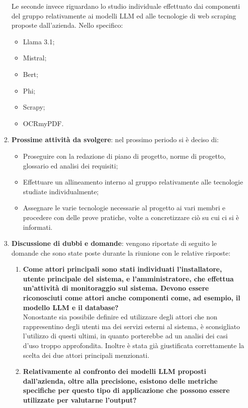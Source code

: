 \begin{enumerate}
    Le seconde invece riguardano lo studio individuale effettuato dai componenti del gruppo relativamente ai modelli LLM ed alle tecnologie di web scraping proposte dall'azienda. Nello specifico:
    \begin{itemize}
        \item Llama 3.1;
        \item Mistral;
        \item Bert;
        \item Phi;
        \item Scrapy;
        \item OCRmyPDF.
    \end{itemize}
    \item \textbf{Prossime attività da svolgere}: nel prossimo periodo si è deciso di:
    \begin{itemize}
        \item Proseguire con la redazione di piano di progetto, norme di progetto, glossario ed analisi dei requisiti;
        \item Effettuare un allineamento interno al gruppo relativamente alle tecnologie studiate individualmente;
        \item Assegnare le varie tecnologie necessarie al progetto ai vari membri e procedere con delle prove pratiche, volte a concretizzare ciò su cui ci si è informati.
    \end{itemize}
    \item \textbf{Discussione di dubbi e domande}: vengono riportate di seguito le domande che sono state poste durante la riunione con le relative risposte:
    \begin{enumerate}[label=\Alph*)]
        \item \textbf{Come attori principali sono stati individuati l'installatore, utente principale del sistema, e l'amministratore, che effettua un'attività di monitoraggio sul sistema. Devono essere riconosciuti come attori anche componenti come, ad esempio, il modello LLM e il database?}\\
        Nonostante sia possibile definire ed utilizzare degli attori che non rappresentino degli utenti ma dei servizi esterni al sistema, è sconsigliato l'utilizzo di questi ultimi, in quanto porterebbe ad un analisi dei casi d'uso troppo approfondita. Inoltre è stata già giustificata correttamente la scelta dei due attori principali menzionati.
        \item \textbf{Relativamente al confronto dei modelli LLM proposti dall'azienda, oltre alla precisione, esistono delle metriche specifiche per questo tipo di applicazione che possono essere utilizzate per valutarne l'output?}\\

\end{enumerate}
\end{enumerate}
